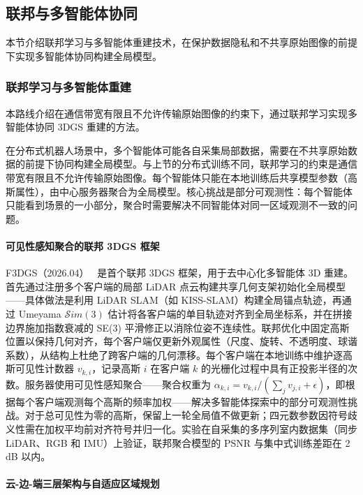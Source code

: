 \subsection{联邦与多智能体协同}
\label{ss:14_8}

本节介绍联邦学习与多智能体重建技术，在保护数据隐私和不共享原始图像的前提下实现多智能体协同构建全局模型。

\subsubsection{联邦学习与多智能体重建}

本路线介绍在通信带宽有限且不允许传输原始图像的约束下，通过联邦学习实现多智能体协同 3DGS 重建的方法。

在分布式机器人场景中，多个智能体可能各自采集局部数据，需要在不共享原始数据的前提下协同构建全局模型。与上节的分布式训练不同，联邦学习的约束是通信带宽有限且不允许传输原始图像。每个智能体只能在本地训练后共享模型参数（高斯属性），由中心服务器聚合为全局模型。核心挑战是部分可观测性：每个智能体只能看到场景的一小部分，聚合时需要解决不同智能体对同一区域观测不一致的问题。

\paragraph{可见性感知聚合的联邦 3DGS 框架}

F3DGS（2026.04）~\cite{2604_01605} 是首个联邦 3DGS 框架，用于去中心化多智能体 3D 重建。首先通过注册多个客户端的局部 LiDAR 点云构建共享几何支架初始化全局模型——具体做法是利用 LiDAR SLAM（如 KISS-SLAM）构建全局锚点轨迹，再通过 Umeyama $\mathcal{S}im(3)$ 估计将各客户端的单目轨迹对齐到全局坐标系，并在拼接边界施加指数衰减的 SE(3) 平滑修正以消除位姿不连续性。联邦优化中固定高斯位置以保持几何对齐，每个客户端仅更新外观属性（尺度、旋转、不透明度、球谐系数），从结构上杜绝了跨客户端的几何漂移。每个客户端在本地训练中维护逐高斯可见性计数器 $v_{k,i}$，记录高斯 $i$ 在客户端 $k$ 的光栅化过程中具有正投影半径的次数。服务器使用可见性感知聚合——聚合权重为 $\alpha_{k,i} = v_{k,i} / (\sum_j v_{j,i} + \epsilon)$，即根据每个客户端观测每个高斯的频率加权——解决多智能体探索中的部分可观测性挑战。对于总可见性为零的高斯，保留上一轮全局值不做更新；四元数参数因符号歧义性需在加权平均前对齐符号并归一化。实验在自采集的多序列室内数据集（同步 LiDAR、RGB 和 IMU）上验证，联邦聚合模型的 PSNR 与集中式训练差距在 2 dB 以内。

\paragraph{云-边-端三层架构与自适应区域规划}

